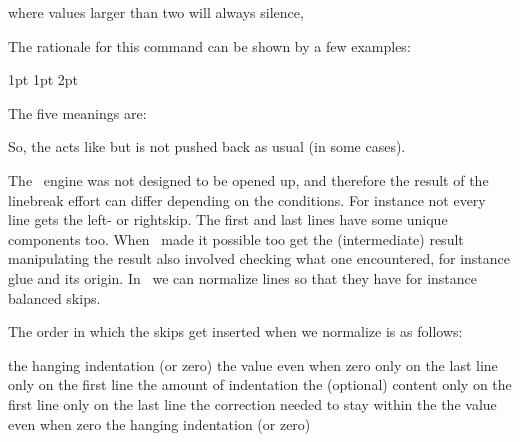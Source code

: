 where values larger than two will always silence,

\stopnewprimitive

\startnewprimitive[title={\prm {norelax}}]

The rationale for this command can be shown by a few examples:

\startbuffer
{} 1pt  1pt  2pt
\edef\testa{\ifdim\dimen0=\dimen2\norelax N\else Y\fi}
\edef\testb{\ifdim\dimen0=\dimen2\relax   N\else Y\fi}
\edef\testc{\ifdim\dimen0=\dimen4\norelax N\else Y\fi}
\edef\testd{\ifdim\dimen0=\dimen4\relax   N\else Y\fi}
\edef\teste{\norelax}
\stopbuffer

\typebuffer

The five meanings are:

\start \getbuffer \starttabulate[|T|T|]
\NC \string\testa \NC \meaning\testa \NC \NR
\NC \string\testb \NC \meaning\testb \NC \NR
\NC \string\testc \NC \meaning\testc \NC \NR
\NC \string\testd \NC \meaning\testd \NC \NR
\NC \string\teste \NC \meaning\teste \NC \NR
\stoptabulate \stop

So, the  acts like  but is not pushed back as
usual (in some cases).

\stopnewprimitive

\startnewprimitive[title={\prm {normalizelinemode}}]

The \TEX\ engine was not designed to be opened up, and therefore the result of
the linebreak effort can differ depending on the conditions. For instance not
every line gets the left- or rightskip. The first and last lines have some unique
components too. When \LUATEX\ made it possible too get the (intermediate) result
manipulating the result also involved checking what one encountered, for instance
glue and its origin. In \LUAMETATEX\ we can normalize lines so that they have for
instance balanced skips.

\starttworows
{}
\stoptworows

The order in which the skips get inserted when we normalize is as follows:

\starttabulate
\NC {}     \NC the hanging indentation (or zero) \NC \NR
\NC {}         \NC the value even when zero \NC \NR
\NC {}  \NC only on the last line \NC \NR
\NC {}  \NC only on the first line \NC \NR
\NC {}       \NC the amount of indentation \NC \NR
\NC \unknown                \NC the (optional) content \NC \NR
\NC {} \NC only on the first line \NC \NR
\NC {} \NC only on the last line \NC \NR
\NC {}   \NC the correction needed to stay within the  \NC \NR
\NC {}        \NC the value even when zero \NC \NR
\NC {}    \NC the hanging indentation (or zero) \NC \NR
\stoptabulate

